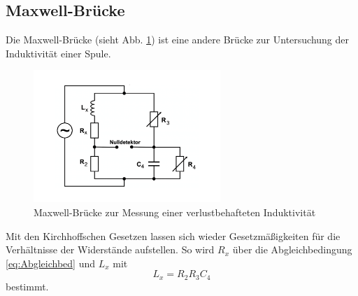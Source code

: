     \subsection{Maxwell-Brücke}
    Die Maxwell-Brücke (sieht Abb. \ref{fig:Maxwell_Bruecke}) ist eine andere Brücke zur Untersuchung der Induktivität einer Spule.
    \begin{figure}
        \centering
        \includegraphics[height= 5cm]{Messdaten/Maxwell.pdf}
        \caption{Maxwell-Brücke zur Messung einer verlustbehafteten Induktivität}
        \label{fig:Maxwell_Bruecke}
    \end{figure}
    Mit den Kirchhoffschen Gesetzen lassen sich wieder Gesetzmäßigkeiten für die Verhältnisse der Widerstände aufstellen.
    So wird $R_x$ über die Abgleichbedingung \eqref{eq:Abgleichbed} und $L_x$ mit
    \begin{equation*}
        L_x = R_2 R_3 C_4
    \end{equation*}
    bestimmt.
